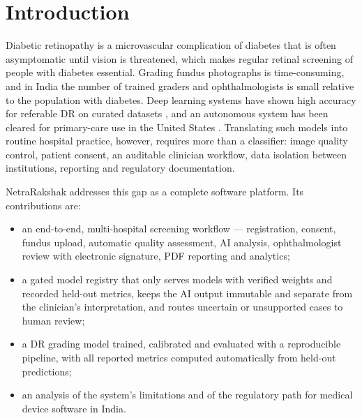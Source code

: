 \documentclass[conference]{IEEEtran}
\begin{document}
\section{Introduction}
Diabetic retinopathy is a microvascular complication of diabetes that is often asymptomatic until vision is
threatened, which makes regular retinal screening of people with diabetes essential. Grading fundus photographs is
time-consuming, and in India the number of trained graders and ophthalmologists is small relative to the population
with diabetes. Deep learning systems have shown high accuracy for referable DR on curated datasets
\cite{gulshan2016,ting2017}, and an autonomous system has been cleared for primary-care use in the United States
\cite{abramoff2018}. Translating such models into routine hospital practice, however, requires more than a classifier:
image quality control, patient consent, an auditable clinician workflow, data isolation between institutions,
reporting and regulatory documentation.

NetraRakshak addresses this gap as a complete software platform. Its contributions are:
\begin{itemize}
\item an end-to-end, multi-hospital screening workflow --- registration, consent, fundus upload, automatic quality
assessment, AI analysis, ophthalmologist review with electronic signature, PDF reporting and analytics;
\item a gated model registry that only serves models with verified weights and recorded held-out metrics, keeps the
AI output immutable and separate from the clinician's interpretation, and routes uncertain or unsupported cases to
human review;
\item a DR grading model trained, calibrated and evaluated with a reproducible pipeline, with all reported metrics
computed automatically from held-out predictions;
\item an analysis of the system's limitations and of the regulatory path for medical device software in India.
\end{itemize}
\end{document}
